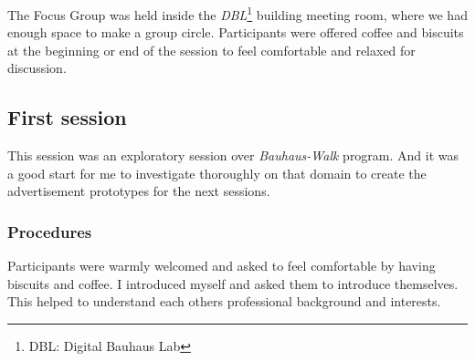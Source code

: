The Focus Group was held inside the \emph{DBL}\footnote{DBL: Digital Bauhaus Lab} building meeting room, where we had enough space to make a group circle. Participants were offered coffee and biscuits at the beginning or end of the session to feel comfortable and relaxed for discussion.


\subsection{First session}
This session was an exploratory session over \emph{Bauhaus-Walk} program. And it was a good start for me to investigate thoroughly on that domain to create the advertisement prototypes for the next sessions.


\subsubsection{Procedures}
Participants were warmly welcomed and asked to feel comfortable by having biscuits and coffee. I introduced myself and asked them to introduce themselves. This helped to understand each others professional background and interests.


